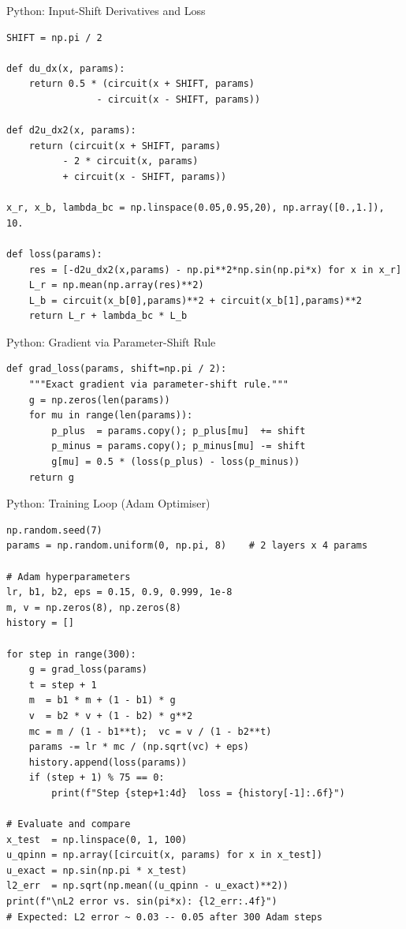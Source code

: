 \documentclass[aspectratio=169,11pt]{beamer}
\begin{document}
\begin{frame}[fragile]{Python: Input-Shift Derivatives and Loss}
\begin{lstlisting}[basicstyle=\scriptsize\ttfamily]
SHIFT = np.pi / 2

def du_dx(x, params):
    return 0.5 * (circuit(x + SHIFT, params)
                - circuit(x - SHIFT, params))

def d2u_dx2(x, params):
    return (circuit(x + SHIFT, params)
          - 2 * circuit(x, params)
          + circuit(x - SHIFT, params))

x_r, x_b, lambda_bc = np.linspace(0.05,0.95,20), np.array([0.,1.]), 10.

def loss(params):
    res = [-d2u_dx2(x,params) - np.pi**2*np.sin(np.pi*x) for x in x_r]
    L_r = np.mean(np.array(res)**2)
    L_b = circuit(x_b[0],params)**2 + circuit(x_b[1],params)**2
    return L_r + lambda_bc * L_b
\end{lstlisting}
\end{frame}

\begin{frame}[fragile]{Python: Gradient via Parameter-Shift Rule}
\begin{lstlisting}[basicstyle=\scriptsize\ttfamily]
def grad_loss(params, shift=np.pi / 2):
    """Exact gradient via parameter-shift rule."""
    g = np.zeros(len(params))
    for mu in range(len(params)):
        p_plus  = params.copy(); p_plus[mu]  += shift
        p_minus = params.copy(); p_minus[mu] -= shift
        g[mu] = 0.5 * (loss(p_plus) - loss(p_minus))
    return g
\end{lstlisting}
\end{frame}

\begin{frame}[fragile]{Python: Training Loop (Adam Optimiser)}
\begin{lstlisting}[basicstyle=\tiny\ttfamily]
np.random.seed(7)
params = np.random.uniform(0, np.pi, 8)    # 2 layers x 4 params

# Adam hyperparameters
lr, b1, b2, eps = 0.15, 0.9, 0.999, 1e-8
m, v = np.zeros(8), np.zeros(8)
history = []

for step in range(300):
    g = grad_loss(params)
    t = step + 1
    m  = b1 * m + (1 - b1) * g
    v  = b2 * v + (1 - b2) * g**2
    mc = m / (1 - b1**t);  vc = v / (1 - b2**t)
    params -= lr * mc / (np.sqrt(vc) + eps)
    history.append(loss(params))
    if (step + 1) % 75 == 0:
        print(f"Step {step+1:4d}  loss = {history[-1]:.6f}")

# Evaluate and compare
x_test  = np.linspace(0, 1, 100)
u_qpinn = np.array([circuit(x, params) for x in x_test])
u_exact = np.sin(np.pi * x_test)
l2_err  = np.sqrt(np.mean((u_qpinn - u_exact)**2))
print(f"\nL2 error vs. sin(pi*x): {l2_err:.4f}")
# Expected: L2 error ~ 0.03 -- 0.05 after 300 Adam steps
\end{lstlisting}
\end{frame}
\end{document}
